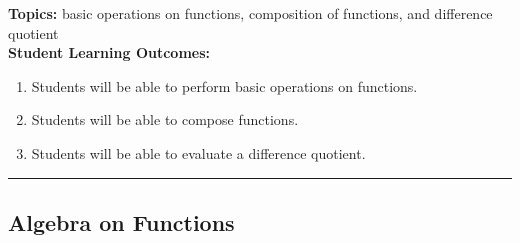 

\noindent \textbf{Topics:}  basic operations on functions, composition of functions, and difference quotient\\

\noindent \textbf{Student Learning Outcomes:}
\begin{enumerate}
\item Students will be able to perform basic operations on functions.
\item Students will be able to compose functions.
\item Students will be able to evaluate a difference quotient.
\end{enumerate}

\hrule 

\bigskip

\subsection{Algebra on Functions}


